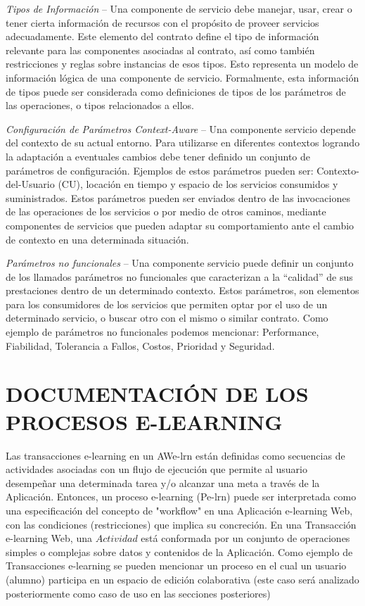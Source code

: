 \textit{Tipos de Información} –  Una componente de servicio debe  manejar, usar,
 crear o tener cierta información de recursos con el propósito de proveer
servicios adecuadamente.  Este elemento del contrato define el tipo de
información relevante para las componentes  asociadas al contrato, así como
también restricciones y reglas sobre instancias de esos tipos. Esto representa
un modelo de información lógica de una componente de servicio. Formalmente, esta
información de tipos puede ser considerada como definiciones de tipos de  los
parámetros de las operaciones, o tipos relacionados a ellos.

\textit{Configuración de Parámetros Context-Aware} – Una componente servicio
depende del contexto de su actual entorno. Para utilizarse en diferentes
contextos logrando la adaptación a eventuales cambios debe tener definido un
conjunto de parámetros de configuración.  Ejemplos de estos parámetros pueden
ser: Contexto-del-Usuario (CU), locación en tiempo y espacio de los servicios
consumidos y suministrados. Estos parámetros pueden ser enviados dentro de las
invocaciones de las operaciones de los servicios o por medio de otros caminos,
mediante componentes de servicios que pueden adaptar su comportamiento ante el
cambio de contexto en una determinada situación.  

\textit{Parámetros no funcionales} – Una componente servicio puede definir un
conjunto de los llamados parámetros no funcionales que caracterizan a la
“calidad” de sus prestaciones dentro de un determinado contexto. Estos
parámetros, son elementos para los consumidores de los servicios que permiten
optar por el uso de un determinado  servicio, o buscar otro con el mismo o
similar contrato. Como ejemplo de parámetros no funcionales podemos mencionar:
Performance, Fiabilidad, Tolerancia a Fallos, Costos, Prioridad y Seguridad.


\section{DOCUMENTACIÓN DE LOS PROCESOS E-LEARNING} \label{documentacion}

Las transacciones e-learning en un AWe-lrn están definidas como secuencias de
actividades asociadas con un flujo de ejecución que permite al usuario
desempeñar una determinada tarea  y/o alcanzar una meta a través de la
Aplicación. Entonces, un proceso e-learning (Pe-lrn) puede ser interpretada como
una especificación del concepto de "workflow" en una Aplicación e-learning Web,
con las condiciones (restricciones) que implica su concreción. En una
Transacción e-learning Web, una  $Actividad$ está  conformada por un conjunto de
operaciones simples o complejas sobre datos y contenidos de la Aplicación. Como
ejemplo de Transacciones e-learning se pueden mencionar un proceso en el cual un
usuario (alumno) participa en un espacio de edición colaborativa (este caso será
analizado posteriormente como caso de uso en las secciones posteriores) 

